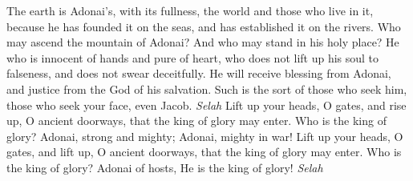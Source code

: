 \begin{biblechapter} %
 The earth is Adonai’s, with its fullness, 
the world and those who live in it,
\verse because he has founded it on the seas, 
and has established it on the rivers.
\verse Who may ascend the mountain of Adonai? 
And who may stand in his holy place?
\verse He who is innocent of hands and pure of heart, 
who does not lift up his soul to falseness, 
and does not swear deceitfully.
\verse He will receive blessing from Adonai, 
and justice from the God of his salvation.
\verse Such is the sort of those who seek him, 
those who seek your face, even Jacob. \textit{Selah}
\verse Lift up your heads, O gates, 
and rise up, O ancient doorways, 
that the king of glory may enter.
\verse Who is the king of glory? 
Adonai, strong and mighty; 
Adonai, mighty in war!
\verse Lift up your heads, O gates, 
and lift up, O ancient doorways, 
that the king of glory may enter.
\verse Who is the king of glory? 
Adonai of hosts, 
He is the king of glory! \textit{Selah}
\end{biblechapter}

